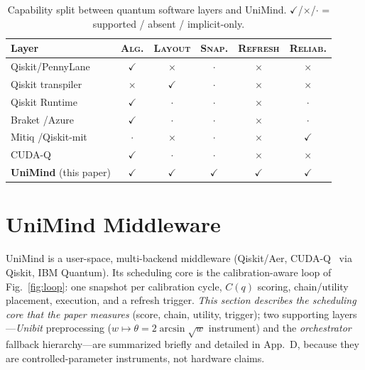 \documentclass[journal,10pt,twocolumn]{IEEEtran}
\begin{document}
\begin{table}[t]
\caption{Capability split between quantum software layers and UniMind. $\checkmark$/$\times$/$\cdot$ =
supported / absent / implicit-only.}
\label{tab:sys}
\centering
\footnotesize
\setlength{\tabcolsep}{3pt}
\begin{tabular}{@{}lccccc@{}}
\toprule
Layer & \textsc{Alg.} & \textsc{Layout} & \textsc{Snap.} & \textsc{Refresh} & \textsc{Reliab.}\\
\midrule
Qiskit/PennyLane \cite{qiskit,berholm2018} & $\checkmark$ & $\times$ & $\cdot$ & $\times$ & $\times$\\
Qiskit transpiler \cite{li2019sabre} & $\times$ & $\checkmark$ & $\cdot$ & $\times$ & $\times$\\
Qiskit Runtime \cite{ibmrtime} & $\checkmark$ & $\cdot$ & $\cdot$ & $\times$ & $\cdot$\\
Braket \cite{braket}/Azure \cite{azureq} & $\checkmark$ & $\cdot$ & $\cdot$ & $\times$ & $\cdot$\\
Mitiq \cite{msp2020}/Qiskit-mit \cite{nation2023} & $\cdot$ & $\times$ & $\cdot$ & $\times$ & $\checkmark$\\
CUDA-Q \cite{cuquantum} & $\checkmark$ & $\cdot$ & $\cdot$ & $\times$ & $\times$\\
\midrule
\textbf{UniMind} (this paper) & $\checkmark$ & $\checkmark$ & $\checkmark$ & $\checkmark$ & $\checkmark$\\
\bottomrule
\end{tabular}
\end{table}

\section{UniMind Middleware}
\label{sec:architecture}
UniMind is a user-space, multi-backend middleware (Qiskit/Aer, CUDA-Q~\cite{cuquantum} via Qiskit, IBM Quantum).
Its scheduling core is the calibration-aware loop of Fig.~\ref{fig:loop}: one snapshot per calibration cycle,
$C(q)$ scoring, chain/utility placement, execution, and a refresh trigger.
\emph{This section describes the scheduling core that the paper measures} (score, chain, utility, trigger);
two supporting layers---\emph{Unibit} preprocessing ($w\mapsto\theta=2\arcsin\sqrt{w}$ instrument) and the
\emph{orchestrator} fallback hierarchy---are summarized briefly and detailed in App.~D, because they are
controlled-parameter instruments, not hardware claims.
\end{document}
